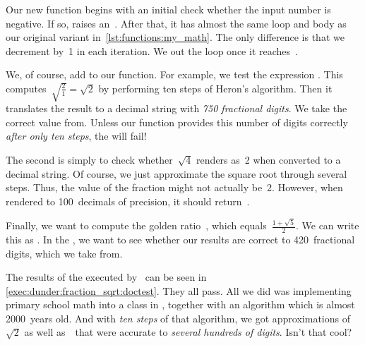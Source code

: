 Our new  function begins with an initial check whether the input number is negative.
If so, raises an~.
After that, it has almost the same loop and body as our original variant in~\cref{lst:functions:my_math}.
The only difference is that we decrement  by~1 in each iteration.
We  out the loop once it reaches~.%
%
\begin{sloppypar}%
We, of course, add  to our function.
For example, we test the expression .
This computes~$\sqrt{\frac{2}{1}}=\sqrt{2}$ by performing ten steps of Heron's algorithm.
Then it translates the result to a decimal string with \emph{750 fractional digits}.
We take the correct value from.
Unless our function provides this number of digits correctly \emph{after only ten steps}, the  will fail!%
\end{sloppypar}%
%
The second  is simply to check whether~$\sqrt{4}$ renders as~2 when converted to a decimal string.
Of course, we just approximate the square root through several steps.
Thus, the value of the fraction might not actually be~2.
However, when rendered to 100~decimals of precision, it should return~.

Finally, we want to compute the golden ratio~\numberGoldenRatio{}, which equals~$\frac{1+\sqrt{5}}{2}$.
We can write this as .
In the , we want to see whether our results are correct to 420~fractional digits, which we take from.

The results of the  executed by \pytest\ can be seen in \cref{exec:dunder:fraction_sqrt:doctest}.
They all pass.
All we did was implementing primary school math into a class in \python, together with an algorithm which is almost 2000~years old.
And with \emph{ten steps} of that algorithm, we got approximations of~$\sqrt{2}$ as well as~\numberGoldenRatio\ that were accurate to \emph{several hundreds of digits}.
Isn't that cool?

